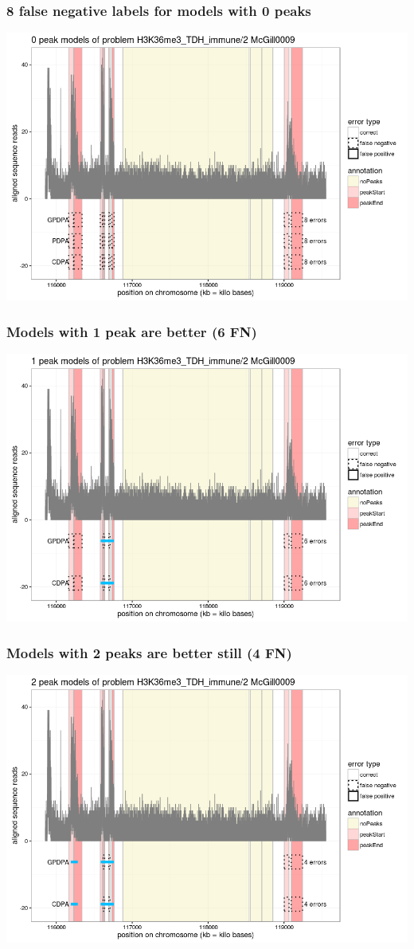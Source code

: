 \documentclass{beamer}
\begin{document}
\begin{frame}
  \frametitle{8 false negative labels for models with 0 peaks}
  \includegraphics[width=\textwidth]{figure-min-train-error-problem5-0peaks}
\end{frame}

\begin{frame}
  \frametitle{Models with 1 peak are better (6 FN)}
  \includegraphics[width=\textwidth]{figure-min-train-error-problem5-1peaks}
\end{frame}

\begin{frame}
  \frametitle{Models with 2 peaks are better still (4 FN)}
  \includegraphics[width=\textwidth]{figure-min-train-error-problem5-2peaks}
\end{frame}
\end{document}
